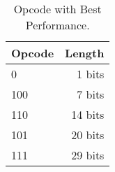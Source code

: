\begin{table}
	\centering
	\begin{tabular}{lr}
		Opcode & Length \\
		\hline
		0 & 1 bits \\
		100 & 7 bits \\
		110 & 14 bits \\
		101 & 20 bits \\
		111 & 29 bits
	\end{tabular}
		

	\caption{Opcode with Best Performance.}
	\label{tab:results-opcode-decodeTable}
\end{table}